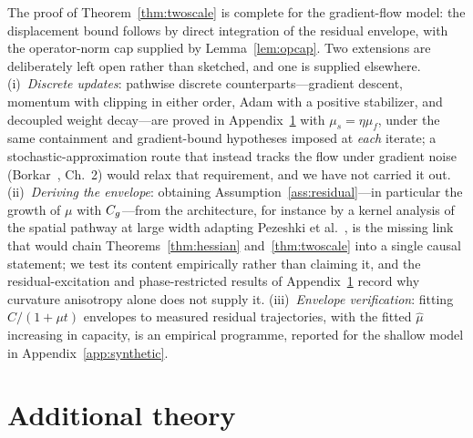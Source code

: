 \begin{remark}
\label{rem:thm2_open}
The proof of Theorem~\ref{thm:twoscale} is complete for the gradient-flow
model: the displacement bound follows by direct integration of the residual
envelope, with the operator-norm cap supplied by Lemma~\ref{lem:opcap}. Two
extensions are deliberately left open rather than sketched, and one is
supplied elsewhere. (i)~\emph{Discrete updates}: pathwise discrete
counterparts---gradient descent, momentum with clipping in either order,
Adam with a positive stabilizer, and decoupled weight decay---are proved in
Appendix~\ref{app:math} with $\mu_s = \eta \mu_f$, under the same
containment and gradient-bound hypotheses imposed at \emph{each} iterate; a
stochastic-approximation route that instead tracks the flow under gradient
noise (Borkar~\citep{borkar2008stochastic}, Ch.~2) would relax that
requirement, and we have not carried it out. (ii)~\emph{Deriving the
envelope}: obtaining Assumption~\ref{ass:residual}---in particular the
growth of $\mu$ with $C_g$---from the architecture, for instance by a
kernel analysis of the spatial pathway at large width adapting Pezeshki et
al.~\citep{pezeshki2021gradient}, is the missing link that would chain
Theorems~\ref{thm:hessian} and~\ref{thm:twoscale} into a single causal
statement; we test its content empirically rather than claiming it, and the
residual-excitation and phase-restricted results of
Appendix~\ref{app:math} record why curvature anisotropy alone does not
supply it. (iii)~\emph{Envelope verification}: fitting $C/(1+\mu t)$
envelopes to measured residual trajectories, with the fitted $\hat{\mu}$
increasing in capacity, is an empirical programme, reported for the shallow
model in Appendix~\ref{app:synthetic}.
\end{remark}

\section{Additional theory}
\label{app:math}

